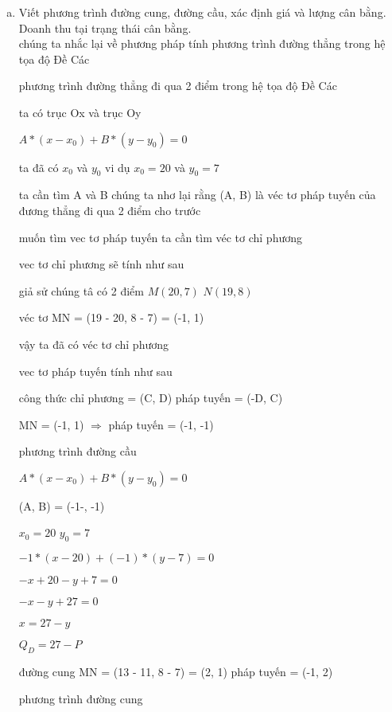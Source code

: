 \begin{enumerate}[(a)]
    \item Viết phương trình đường cung, đường cầu, xác định giá và lượng cân bằng. Doanh thu
          tại trạng thái cân bằng.
          \\
          chúng ta nhắc lại về phương pháp tính phương trình đường thẳng trong hệ tọa độ Đề Các

          phương trình đường thẳng
          đi qua 2 điểm trong hệ tọa độ Đề Các

          ta có trục Ox và trục Oy

          $A * (x - x_0) + B * (y - y_0) = 0$

          ta đã có $x_0$ và $y_0$
          vi dụ $x_0 = 20$ và $y_0 = 7$

          ta cần tìm A và B
          chúng ta nhơ lại rằng (A, B) là véc tơ pháp tuyến  của đương thẳng đi qua 2 điểm cho trước

          muốn tìm  vec tơ pháp tuyến ta cần tìm véc tơ chỉ phương

          vec tơ chỉ phương sẽ tính như sau

          giả sử chúng tâ có 2 điểm
          $M(20, 7)$ $N(19, 8)$

          véc tơ MN = (19 - 20, 8 - 7) = (-1, 1)

          vậy ta đã có véc tơ chỉ phương

          vec tơ pháp tuyến tính như sau

          công thức
          chỉ phương = (C, D)
          pháp tuyến = (-D, C)

          MN =  (-1, 1)
          $\Rightarrow$ pháp tuyến = (-1, -1)

          phương trình đường cầu

          $A * (x - x_0) + B * (y - y_0) = 0$

          (A, B) = (-1-, -1)

          $x_0 = 20$ $y_0= 7$

          $-1 * (x - 20) + (-1) * (y - 7) = 0$

          $-x + 20 - y + 7 = 0$

          $-x - y + 27 = 0$

          $x = 27 - y$

          $Q_D = 27 - P$

          đường cung
          MN = (13 - 11, 8 - 7) = (2, 1)
          pháp tuyến = (-1, 2)

          phương trình đường cung


\end{enumerate}
